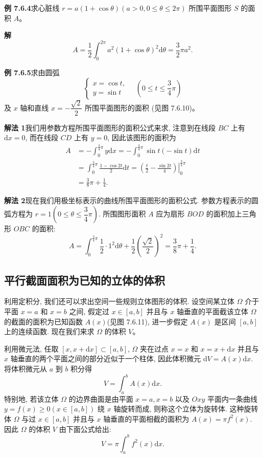 \documentclass[UTF8, 12pt, fontset=fandol, oneside]{ctexart}
\begin{document}
\noindent\textbf{例 7.6.4}\quad 求心脏线 $r=a(1+\cos\theta)(a>0,0\leq\theta\leq2\pi)$ 所围平面图形 $S$ 的面积 $A$。

\noindent\textbf{解}\quad
\[
  A=\frac{1}{2}\int_0^{2\pi}a^2(1+\cos\theta)^2\mathrm d\theta=\frac{3}{2}\pi a^2.
\]

\noindent\textbf{例 7.6.5}\quad 求由圆弧
\[
  \begin{cases}
    x=\cos t,\\
    y=\sin t
  \end{cases}
  \quad\left(0\leq t\leq\frac{3}{4}\pi\right)
\]
及 $x$ 轴和直线 $x=-\dfrac{\sqrt2}{2}$ 所围平面图形的面积 (见图 7.6.10)。

\noindent\textbf{解法 1}\quad 我们用参数方程所围平面图形的面积公式来求, 注意到在线段 $BC$ 上有 $\mathrm dx=0$, 而在线段 $CD$ 上有 $y=0$, 因此该图形的面积为
\[
\begin{aligned}
  A&=-\int_0^{\frac34\pi}y\mathrm dx
  =-\int_0^{\frac34\pi}\sin t(-\sin t)\mathrm dt\\
  &=\int_0^{\frac34\pi}\frac{1-\cos2t}{2}\mathrm dt
  =\left.\left(\frac{t}{2}-\frac{\sin2t}{4}\right)\right|_0^{\frac34\pi}\\
  &=\frac{3}{8}\pi+\frac{1}{4}.
\end{aligned}
\]

\noindent\textbf{解法 2}\quad 现在我们用极坐标表示的曲线所围平面图形的面积公式. 参数方程表示的圆弧方程为 $r=1\left(0\leq\theta\leq\dfrac{3}{4}\pi\right)$. 所围图形面积 $A$ 应为扇形 $BOD$ 的面积加上三角形 $OBC$ 的面积:
\[
  A=\int_0^{\frac34\pi}\frac{1}{2}\cdot1^2\mathrm d\theta
  +\frac{1}{2}\left(\frac{\sqrt2}{2}\right)^2
  =\frac{3}{8}\pi+\frac{1}{4}.
\]

\subsection{平行截面面积为已知的立体的体积}

利用定积分, 我们还可以求出空间一些规则立体图形的体积. 设空间某立体 $\Omega$ 介于平面 $x=a$ 和 $x=b$ 之间, 假定过 $x\in[a,b]$ 并且与 $x$ 轴垂直的平面截该立体 $\Omega$ 的截面的面积为已知函数 $A(x)$(见图 7.6.11), 进一步假定 $A(x)$ 是区间 $[a,b]$ 上的连续函数. 现在我们来求 $\Omega$ 的体积 $V$。

利用微元法, 任取 $[x,x+\mathrm dx]\subset[a,b]$, $\Omega$ 夹在过点 $x=x$ 和 $x=x+\mathrm dx$ 并且与 $x$ 轴垂直的两个平面之间的部分近似于一个柱体, 因此体积微元 $\mathrm dV=A(x)\mathrm dx$. 将体积微元从 $a$ 到 $b$ 积分得
\[
  V=\int_a^b A(x)\mathrm dx.
\]
特别地, 若该立体 $\Omega$ 的边界曲面是由平面 $x=a,x=b$ 以及 $Oxy$ 平面内一条曲线 $y=f(x)\geq0(x\in[a,b])$ 绕 $x$ 轴旋转而成, 则称这个立体为旋转体. 这种旋转体 $\Omega$ 与过 $x\in[a,b]$ 并且与 $x$ 轴垂直的平面相截的面积为 $A(x)=\pi f^2(x)$. 因此 $\Omega$ 的体积 $V$ 由下面公式给出:
\[
  V=\pi\int_a^b f^2(x)\mathrm dx.
\]
\end{document}
